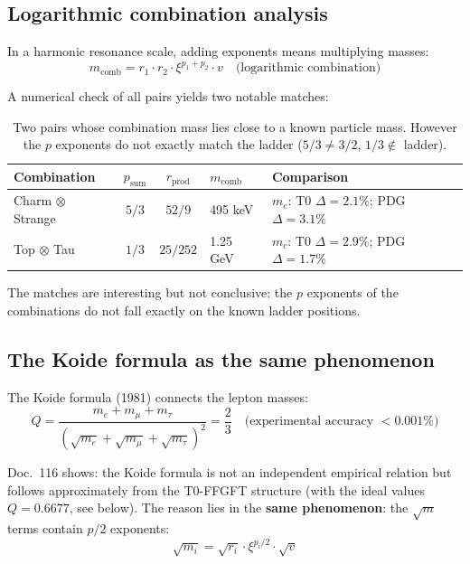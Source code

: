 \subsection{Logarithmic combination analysis}

In a harmonic resonance scale, adding exponents means multiplying
masses:
\begin{equation}
    m_{\text{comb}} = r_1 \cdot r_2 \cdot \xi^{p_1+p_2} \cdot v
    \quad \text{(logarithmic combination)}
\end{equation}

A numerical check of all pairs yields two notable matches:

\begin{table}[htbp]
\centering\footnotesize
\begin{tabular}{lccll}
\toprule
\textbf{Combination} & $p_{\text{sum}}$ & $r_{\text{prod}}$ & $m_{\text{comb}}$ & \textbf{Comparison} \\
\midrule
Charm $\otimes$ Strange & $5/3$ & $52/9$ & 495 keV & $m_e$: T0 $\Delta{=}2.1\%$; PDG $\Delta{=}3.1\%$ \\
Top $\otimes$ Tau       & $1/3$ & $25/252$ & 1.25 GeV & $m_c$: T0 $\Delta{=}2.9\%$; PDG $\Delta{=}1.7\%$ \\
\bottomrule
\end{tabular}
\caption{Two pairs whose combination mass lies close to a known
particle mass. However the $p$ exponents do not exactly match the
ladder ($5/3 \neq 3/2$, $1/3 \notin$ ladder).}
\label{tab:combination}
\end{table}

The matches are interesting but not conclusive: the $p$ exponents
of the combinations do not fall exactly on the known ladder positions.

\subsection{The Koide formula as the same phenomenon}

The Koide formula (1981) connects the lepton masses:
\begin{equation}
    Q = \frac{m_e + m_\mu + m_\tau}
    {(\sqrt{m_e} + \sqrt{m_\mu} + \sqrt{m_\tau})^2} = \frac{2}{3}
    \quad \text{(experimental accuracy $< 0.001\%$)}
\end{equation}

Doc.~116 shows: the Koide formula is not an independent empirical
relation but follows approximately from the T0-FFGFT structure
(with the ideal values $Q = 0.6677$, see below). The
reason lies in the \textbf{same phenomenon}: the $\sqrt{m}$ terms
contain $p/2$ exponents:
\begin{equation}
    \sqrt{m_i} = \sqrt{r_i} \cdot \xi^{p_i/2} \cdot \sqrt{v}
\end{equation}

